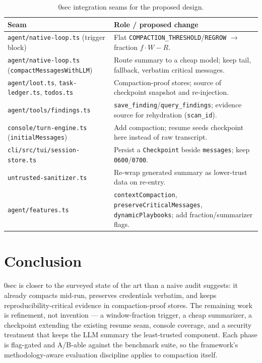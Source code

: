 \documentclass[11pt]{article}
\begin{document}
\begin{table}[t]
\centering
\small
\begin{tabular}{@{}p{4.6cm}p{8.4cm}@{}}
\toprule
\textbf{Seam} & \textbf{Role / proposed change} \\
\midrule
\texttt{agent/native-loop.ts} (trigger block) &
Flat \texttt{COMPACTION\_THRESHOLD}/\texttt{REGROW} $\to$ fraction $f\cdot W - R$. \\
\texttt{agent/native-loop.ts} \newline (\texttt{compactMessagesWithLLM}) &
Route summary to a cheap model; keep tail, fallback, verbatim critical messages. \\
\texttt{agent/loot.ts}, \texttt{task-ledger.ts}, \texttt{todos.ts} &
Compaction-proof stores; source of checkpoint snapshot and re-injection. \\
\texttt{agent/tools/findings.ts} &
\texttt{save\_finding}/\texttt{query\_findings}; evidence source for rehydration
(\texttt{scan\_id}). \\
\texttt{console/turn-engine.ts} (\texttt{initialMessages}) &
Add compaction; resume seeds checkpoint here instead of raw transcript. \\
\texttt{cli/src/tui/session-store.ts} &
Persist a \texttt{Checkpoint} beside \texttt{messages}; keep \texttt{0600}/\texttt{0700}. \\
\texttt{untrusted-sanitizer.ts} &
Re-wrap generated summary as lower-trust data on re-entry. \\
\texttt{agent/features.ts} &
\texttt{contextCompaction}, \texttt{preserveCriticalMessages}, \texttt{dynamicPlaybooks}; add fraction/summarizer flags. \\
\bottomrule
\end{tabular}
\caption{0sec integration seams for the proposed design.}
\label{tab:seams}
\end{table}

\section{Conclusion}

0sec is closer to the surveyed state of the art than a naive audit suggests: it
already compacts mid-run, preserves credentials verbatim, and keeps
reproducibility-critical evidence in compaction-proof stores. The remaining work
is refinement, not invention --- a window-fraction trigger, a cheap summarizer, a
checkpoint extending the existing resume seam, console coverage, and a security
treatment that keeps the LLM summary the least-trusted component. Each phase is
flag-gated and A/B-able against the benchmark suite, so the framework's
methodology-aware evaluation discipline applies to compaction itself.
\end{document}
